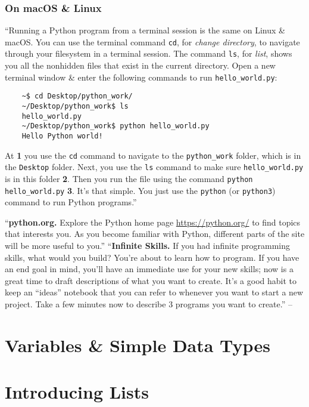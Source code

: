 \documentclass[oneside]{book}
\numberwithin{equation}{section}
\begin{document}
\subsubsection{On macOS \& Linux}
``Running a Python program from a terminal session is the same on Linux \& macOS. You can use the terminal command \texttt{cd}, for \textit{change directory}, to navigate through your filesystem in a terminal session. The command \texttt{ls}, for \textit{list}, shows you all the nonhidden files that exist in the current directory. Open a new terminal window \& enter the following commands to run \verb|hello_world.py|:
\begin{verbatim}
	~$ cd Desktop/python_work/
	~/Desktop/python_work$ ls
	hello_world.py
	~/Desktop/python_work$ python hello_world.py
	Hello Python world!
\end{verbatim}
At \textbf{1} you use the \texttt{cd} command to navigate to the \verb|python_work| folder, which is in the \texttt{Desktop} folder. Next, you use the \texttt{ls} command to make sure \verb|hello_world.py| is in this folder \textbf{2}. Then you run the file using the command \verb|python hello_world.py| \textbf{3}. It's that simple. You just use the \texttt{python} (or \texttt{python3}) command to run Python programs.''

``\textbf{python.org.} Explore the Python home page \url{https://python.org/} to find topics that interests you. As you become familiar with Python, different parts of the site will be more useful to you.'' ``\textbf{Infinite Skills.} If you had infinite programming skills, what would you build? You're about to learn how to program. If you have an end goal in mind, you'll have an immediate use for your new skills; now is a great time to draft descriptions of what you want to create. It's a good habit to keep an ``ideas'' notebook that you can refer to whenever you want to start a new project. Take a few minutes now to describe 3 programs you want to create.'' -- \cite[pp. 12--13]{Matthes2019}


\section{Variables \& Simple Data Types}


\section{Introducing Lists}
\end{document}
